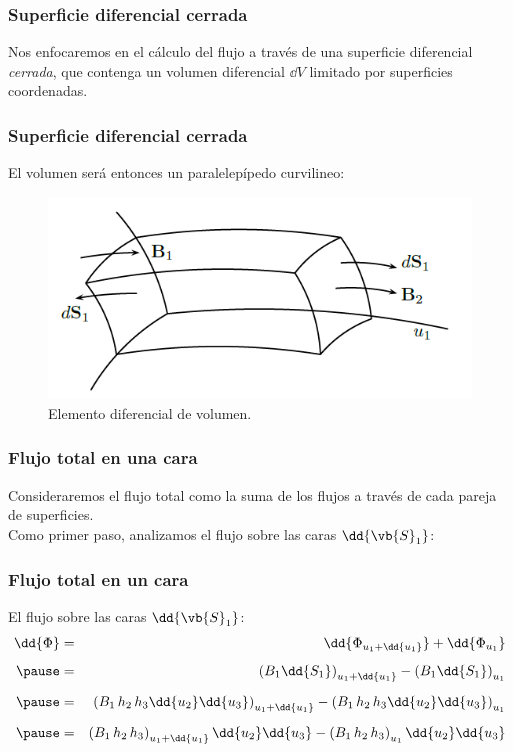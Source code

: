 \begin{frame}
\frametitle{Superficie diferencial cerrada}
Nos enfocaremos en el cálculo del flujo a través de una superficie diferencial \emph{cerrada}, que contenga un volumen diferencial $\dd{V}$ limitado por superficies coordenadas.
\end{frame}
\begin{frame}
\frametitle{Superficie diferencial cerrada}
El volumen será entonces un paralelepípedo curvilineo:
\begin{figure}[h!]
    \centering
    \includegraphics[scale=0.5]{Imagenes/Diferencial_Volumen.png}
    \caption{Elemento diferencial de volumen.}
    \label{fig:Diferencial_Volumen}
\end{figure}
\end{frame}
\begin{frame}
\frametitle{Flujo total en una cara}
Consideraremos el flujo total como la suma de los flujos a través de cada pareja de superficies.
\\
\bigskip
Como primer paso, analizamos el flujo sobre las caras $\dd{\vb{S}_{1}}$:
\end{frame}
\begin{frame}
\frametitle{Flujo total en un cara}
El flujo sobre las caras $\dd{\vb{S}_{1}}$:
\begin{eqnarray*}
\dd{\Phi} &=& \dd{\Phi_{u_{1} + \dd{u_{1}}}} + \dd{\Phi_{u_{1}}} \\[0.5em] \pause
&=& \left( B_{1} \dd{S_{1}} \right)_{u_{1} + \dd{u_{1}}} - \left( B_{1} \dd{S_{1}} \right)_{u_{1}} \\[0.5em] \pause
&=& \left( B_{1} \, h_{2} \, h_{3} \dd{u_{2}} \dd{u_{3}} \right)_{u_{1} + \dd{u_{1}}} - \left( B_{1} \, h_{2} \, h_{3} \dd{u_{2}} \dd{u_{3}} \right)_{u_{1}} \\[0.5em] \pause
&=& \left( B_{1} \, h_{2} \, h_{3} \right)_{u_{1} + \dd{u_{1}}} \dd{u_{2}} \dd{u_{3}} - \left( B_{1} \, h_{2} \, h_{3} \right)_{u_{1}} \dd{u_{2}} \dd{u_{3}}
\end{eqnarray*}
\end{frame} 
